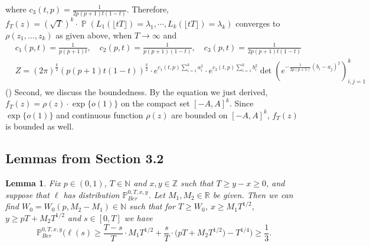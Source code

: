 \documentclass[12pt]{article}
\newtheorem{lemma}{Lemma}
\DeclareMathOperator{\pr}{\mathbb{P}}
\begin{document}
where $c_{3}(t,p)=\frac{1}{2p(p+1)t(1-t)}$.
Therefore, $f_{T}(z)=(\sqrt{T})^{k}\cdot\pr(L_1(\lfloor tT\rfloor)=\lambda_1,\cdots, L_k(\lfloor tT\rfloor)=\lambda_k)$ converges to $\rho(z_{1},\dots,z_{k})$ as given above, when $T\rightarrow\infty$ and 
\begin{align*}
	&c_{1}(p,t)=\frac{1}{p(p+1)t}, \quad c_{2}(p,t)=\frac{1}{p(p+1)(1-t)}, \quad c_{3}(p,t)=\frac{1}{2p(p+1)t(1-t)}\\
	&Z=(2\pi)^{\frac{k}{2}}(p(p+1)t(1-t))^{\frac{k}{2}}\cdot e^{c_{1}(t,p)\sum_{i=1}^{k}a_{i}^{2}}\cdot e^{c_{2}(t,p)\sum_{i=1}^{k}b_{i}^{2}}\det\left(e^{-\frac{1}{2p(p+1)}(b_{i}-a_{j})^{2}}\right)_{i,j=1}^{k}
\end{align*}
() Second, we discuss the boundedness. By the equation we just derived, $f_{T}(z)=\rho(z)\cdot\exp\{o(1)\}$ on the compact set $[-A,A]^{k}$. Since $\exp\{o(1)\}$ and continuous function $\rho(z)$ are bounded on $[-A,A]^{k}$, $f_{T}(z)$ is bounded as well.



	\subsection*{Lemmas from Section 3.2}
	
	\begin{lemma}\label{LemmaHalfS4} Fix $p \in (0,1)$, $T \in \mathbb{N}$ and $x, y\in \mathbb{Z}$ such that $T \geq y-x \geq 0$, and suppose that $\ell$ has distribution $\mathbb{P}^{0,T,x,y}_{Ber}$. Let $M_1, M_2 \in \mathbb{R}$ be given. Then we can find $W_0 = W_0(p,M_2 - M_1) \in \mathbb{N}$ such that for $T \geq W_0$, $x \geq M_1 T^{1/2}$, $y \geq pT + M_2 T^{1/2}$ and $s \in [0,T]$ we have
		\begin{equation}\label{halfEq1S4}
		\mathbb{P}^{0,T,x,y}_{Ber}\Big( \ell(s)  \geq \frac{T-s}{T} \cdot M_1 T^{1/2} + \frac{s}{T} \cdot \big(p T + M_2 T^{1/2}\big) - T^{1/4} \Big) \geq \frac{1}{3}.
		\end{equation}
	\end{lemma}
\end{document}
